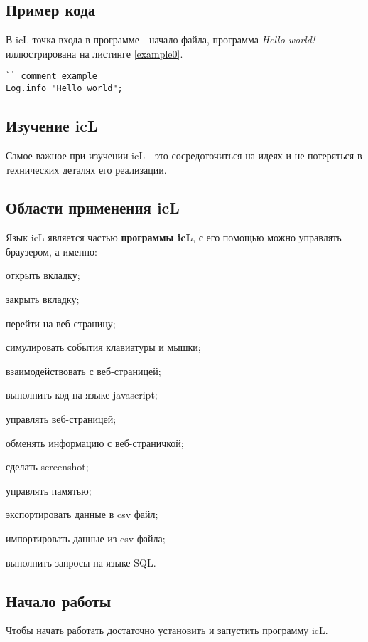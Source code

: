 \subsection{Пример кода}

В icL точка входа в программе - начало файла, программа \textit{Hello world!} иллюстрирована на листинге \ref{example0}.

\begin{lstlisting}[caption=Пример, label=example0]
`` comment example
Log.info "Hello world";
\end{lstlisting}

\subsection{Изучение icL}

Самое важное при изучении icL - это сосредоточиться на идеях и не потеряться в технических деталях его реализации.

\subsection{Области применения icL}

Язык icL является частью \textbf{программы icL}, с его помощью можно управлять браузером, а именно:
\begin{icItems}
\item
	открыть вкладку;
\item
	закрыть вкладку;
\item
	перейти на веб-страницу;
\item
	симулировать события клавиатуры и мышки;
\item
	взаимодействовать с веб-страницей;
\item
	выполнить код на языке javascript;
\item
	управлять веб-страницей;
\item
	обменять информацию с веб-страничкой;
\item
	сделать screenshot;
\item
	управлять памятью;
\item
	экспортировать данные в csv файл;
\item
	импортировать данные из csv файла;
\item
	выполнить запросы на языке SQL.
\end{icItems}

\subsection{Начало работы}

Чтобы начать работать достаточно установить и запустить программу icL.
